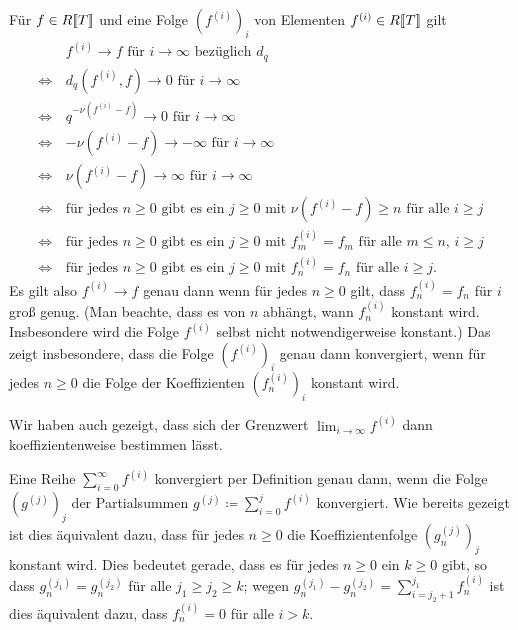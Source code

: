 \documentclass[a4paper, 10pt, numbers=noenddot]{scrartcl}
\begin{document}
Für $f \in R[\![T]\!]$ und eine Folge $(f^{(i)})_i$ von Elementen $f^{(i)} \in R[\![T]\!]$ gilt
\begin{align*}
      &\, \text{$f^{(i)} \to f$ für $i \to \infty$ bezüglich $d_q$} \\
  \iff&\, \text{$d_q(f^{(i)}, f) \to 0$ für $i \to \infty$} \\
  \iff&\, \text{$q^{-\nu(f^{(i)} - f)} \to 0$ für $i \to \infty$} \\
  \iff&\, \text{$-\nu(f^{(i)} - f) \to -\infty$ für $i \to \infty$} \\
  \iff&\, \text{$\nu(f^{(i)} - f) \to \infty$ für $i \to \infty$} \\
  \iff&\, \text{für jedes $n \geq 0$ gibt es ein $j \geq 0$ mit $\nu(f^{(i)} - f) \geq n$ für alle $i \geq j$}  \\
  \iff&\, \text{für jedes $n \geq 0$ gibt es ein $j \geq 0$ mit $f^{(i)}_m = f_m$ für alle $m \leq n$, $i \geq j$}  \\
  \iff&\, \text{für jedes $n \geq 0$ gibt es ein $j \geq 0$ mit $f^{(i)}_n = f_n$ für alle $i \geq j$}.
\end{align*}
Es gilt also $f^{(i)} \to f$ genau dann wenn für jedes $n \geq 0$ gilt, dass $f^{(i)}_n = f_n$ für $i$ groß genug.
(Man beachte, dass es von $n$ abhängt, wann $f^{(i)}_n$ konstant wird.
Insbesondere wird die Folge $f^{(i)}$ selbst nicht notwendigerweise konstant.)
Das zeigt insbesondere, dass die Folge $(f^{(i)})_i$ genau dann konvergiert, wenn für jedes $n \geq 0$ die Folge der Koeffizienten $(f^{(i)}_n)_i$ konstant wird.

Wir haben auch gezeigt, dass sich der Grenzwert $\lim_{i \to \infty} f^{(i)}$ dann koeffizientenweise bestimmen lässt.

Eine Reihe $\sum_{i = 0}^\infty f^{(i)}$ konvergiert per Definition genau dann, wenn die Folge $(g^{(j)})_j$ der Partialsummen $g^{(j)} \coloneqq \sum_{i=0}^j f^{(i)}$ konvergiert.
Wie bereits gezeigt ist dies äquivalent dazu, dass für jedes $n \geq 0$ die Koeffizientenfolge $(g^{(j)}_n)_j$ konstant wird.
Dies bedeutet gerade, dass es für jedes $n \geq 0$ ein $k \geq 0$ gibt, so dass $g^{(j_1)}_n = g^{(j_2)}_n$ für alle $j_1 \geq j_2 \geq k$;
wegen $g^{(j_1)}_n - g^{(j_2)}_n = \sum_{i = j_2 + 1}^{j_1} f^{(i)}_n$ ist dies äquivalent dazu, dass $f^{(i)}_n = 0$ für alle $i > k$.
\end{document}

